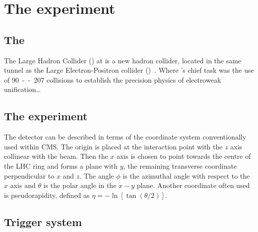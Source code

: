 \chapter{The \CMS experiment}
\label{chap:detector}


\section{The \LHC}
The Large Hadron Collider (\LHC) at \CERN is a new hadron collider,
located in the same tunnel as the Large Electron-Positron collider
(\LEP)~\cite{Brianti:2004qq}. Where \LEP's chief task was the use
of \unit{90--207}{\GeV} \epluseminus collisions to establish the
precision physics of electroweak unification\dots

\section{The \CMS experiment}
\label{sec:CMSInDetail}

The detector can be described in terms of the coordinate system conventionally used within CMS. The
origin is placed at the interaction point with the $z$ axis collinear with the
beam. Then the $x$ axis is chosen to point towards the centre of the LHC ring
and forms a plane with $y$, the remaining transverse coordinate perpendicular to
$x$ and $z$. The angle $\phi$ is the azimuthal angle with respect to the $x$
axis and $\theta$ is the polar angle in the $x-y$ plane. Another coordinate
often used is pseudorapidity, defined as $\eta = - \ln[\tan(\theta/2)]$. 


\section{Trigger system}
\label{sec:triggers}
